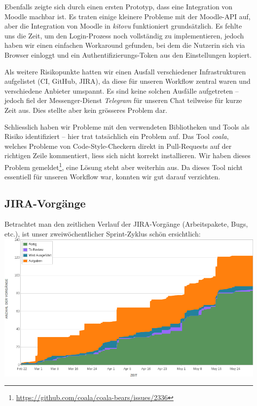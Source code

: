 \documentclass[a4paper]{article}
\begin{document}
Ebenfalls zeigte sich durch einen ersten Prototyp, dass eine Integration von
Moodle machbar ist. Es traten einige kleinere Probleme mit der Moodle-API auf,
aber die Integration von Moodle in \emph{kitovu} funktioniert grundsätzlich. Es
fehlte uns die Zeit, um den Login-Prozess noch vollständig zu implementieren,
jedoch haben wir einen einfachen Workaround gefunden, bei dem die Nutzerin sich
via Browser einloggt und ein Authentifizierungs-Token aus den Einstellungen kopiert.

Als weitere Risikopunkte hatten wir einen Ausfall verschiedener Infrastrukturen
aufgelistet (CI, GitHub, JIRA), da diese für unseren Workflow
zentral waren und verschiedene Anbieter umspannt. Es sind keine solchen
Ausfälle aufgetreten -- jedoch fiel der Messenger-Dienst \emph{Telegram} für
unseren Chat teilweise für kurze Zeit aus. Dies stellte aber kein grösseres
Problem dar.

Schliesslich haben wir Probleme mit den verwendeten Bibliotheken und Tools
als Risiko identifiziert -- hier trat tatsächlich ein Problem auf. Das Tool
\emph{coala}, welches Probleme von Code-Style-Checkern direkt in
Pull-Requests auf der richtigen Zeile kommentiert, liess sich nicht korrekt
installieren. Wir haben dieses Problem
gemeldet\footnote{\url{https://github.com/coala/coala-bears/issues/2336}}, eine
Lösung steht aber weiterhin aus. Da dieses Tool nicht essentiell für unseren
Workflow war, konnten wir gut darauf verzichten.

\subsection{JIRA-Vorgänge}

Betrachtet man den zeitlichen Verlauf der JIRA-Vorgänge (Arbeitspakete, Bugs, etc.), ist unser zweiwöchentlicher Sprint-Zyklus schön ersichtlich: \\

\includegraphics[width=\linewidth]{img/issues.png}
\end{document}
